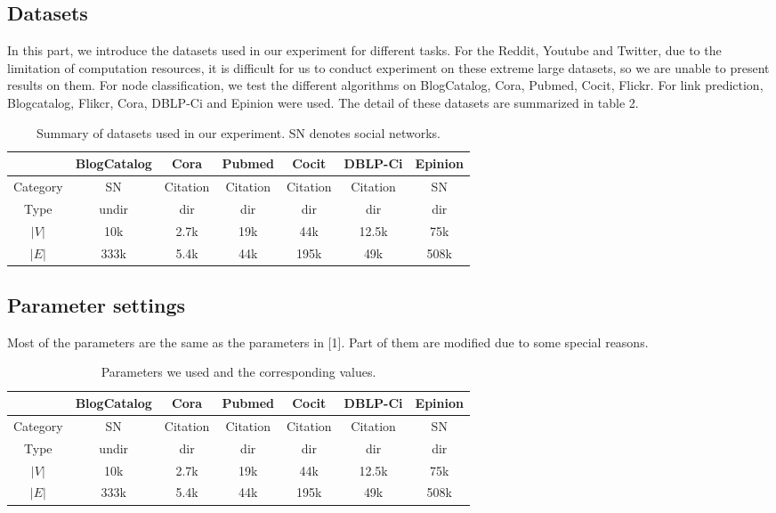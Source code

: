 \documentclass[a4paper]{article}
\begin{document}
\subsection{Datasets}
\noindent In this part, we introduce the datasets used in our experiment for different tasks. For the Reddit, Youtube and Twitter, due to the limitation of computation resources, it is difficult for us to conduct experiment on these extreme large datasets, so we are unable to present results on them. For node classification, we test the different algorithms on BlogCatalog, Cora, Pubmed, Cocit, Flickr. For link prediction, Blogcatalog, Flikcr, Cora, DBLP-Ci and Epinion were used. The detail of these datasets are summarized in table 2.
\begin{table}[]
    \centering
\begin{tabular}{c|c|c|c|c|c|c}
\toprule  
& BlogCatalog& Cora & Pubmed& Cocit &DBLP-Ci &Epinion\\
\midrule  
Category & SN& Citation&Citation&Citation&Citation &SN\\
Type& undir& dir & dir & dir & dir & dir\\
$|V|$ &10k &2.7k &19k &44k &12.5k & 75k\\
$|E|$ &333k & 5.4k &44k & 195k &49k &508k\\
\bottomrule 
\end{tabular}
\caption{Summary of datasets used in our experiment. SN denotes social networks.}
\end{table}


\subsection{Parameter settings}
Most of the parameters are the same as the parameters in [1]. Part of them are modified due to some special reasons.
\begin{table}[]
    \centering
\begin{tabular}{c|c|c|c|c|c|c}
\toprule  
& BlogCatalog& Cora & Pubmed& Cocit &DBLP-Ci &Epinion\\
\midrule  
Category & SN& Citation&Citation&Citation&Citation &SN\\
Type& undir& dir & dir & dir & dir & dir\\
$|V|$ &10k &2.7k &19k &44k &12.5k & 75k\\
$|E|$ &333k & 5.4k &44k & 195k &49k &508k\\
\bottomrule 
\end{tabular}
\caption{Parameters we used and the corresponding values.}
\end{table}
\end{document}
